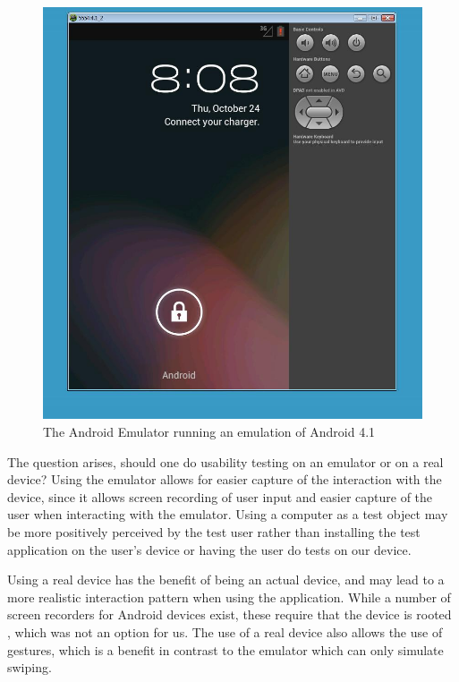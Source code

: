\begin{figure}
\begin{center}
\includegraphics[scale=0.4]{Pictures/app-screenshots/androidemulator.png}
\end{center}
\caption{The Android Emulator running an emulation of Android 4.1}
\label{fig:androidemulator}
\end{figure}

The question arises, should one do usability testing on an emulator or on a real device?
Using the emulator allows for easier capture of the interaction with the device, since it allows screen recording of user input and easier capture of the user when interacting with the emulator. Using a computer as a test object may be more positively perceived by the test user rather than installing the test application on the user's device or having the user do tests on our device. 

Using a real device has the benefit of being an actual device, and may lead to a more realistic interaction pattern when using the application. While a number of screen recorders for Android devices exist, these require that the device is rooted , which was not an option for us. 
The use of a real device also allows the use of gestures, which is a benefit in contrast to the emulator which can only simulate swiping. 


